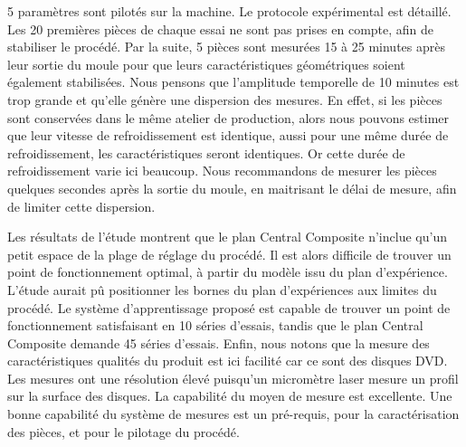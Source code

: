 5 paramètres sont pilotés sur la machine. %
Le protocole expérimental est détaillé.
Les 20 premières pièces de chaque essai ne sont pas prises en compte, afin de stabiliser le procédé.
Par la suite, 5 pièces sont mesurées 15 à 25 minutes après leur sortie du moule pour que leurs caractéristiques géométriques soient également stabilisées.
Nous pensons que l'amplitude temporelle de 10 minutes est trop grande et qu'elle génère une dispersion des mesures.
En effet, si les pièces sont conservées dans le même atelier de production, alors nous pouvons estimer que leur vitesse de refroidissement est identique, aussi pour une même durée de refroidissement, les caractéristiques seront identiques.
Or cette durée de refroidissement varie ici beaucoup. 
Nous recommandons de mesurer les pièces quelques secondes après la sortie du moule, en maitrisant le délai de mesure, afin de limiter cette dispersion.

Les résultats de l'étude montrent que le plan Central Composite n'inclue qu'un petit espace de la plage de réglage du procédé.
Il est alors difficile de trouver un point de fonctionnement optimal, à partir du modèle issu du plan d’expérience.
L'étude aurait pû positionner les bornes du plan d'expériences aux limites du procédé.
Le système d'apprentissage proposé est capable de trouver un point de fonctionnement satisfaisant en 10 séries d'essais, tandis que le plan Central Composite demande 45 séries d'essais.
Enfin, nous notons que la mesure des caractéristiques qualités du produit est ici facilité car ce sont des disques DVD.
Les mesures ont une résolution élevé puisqu'un micromètre laser mesure un profil sur la surface des disques.
La capabilité du moyen de mesure est excellente.
Une bonne capabilité du système de mesures est un pré-requis, pour la caractérisation des pièces, et pour le pilotage du procédé.

